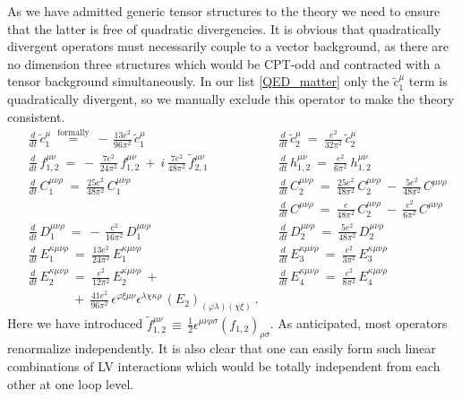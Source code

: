 \documentclass[12pt,preprintnumbers,nofootinbib]{revtex4}
\newcommand{\wt}{\widetilde}
\begin{document}
	As we have admitted generic tensor structures to the theory
	we need to ensure that the latter is free of quadratic divergencies.
	It is obvious that quadratically divergent operators must necessarily
	couple to a vector background, as there are no dimension
	three structures which would be CPT-odd and contracted with a tensor
	background simultaneously. 
	In our list \eqref{QED_matter} only the $ \wt{c}_1^\mu $ term is
	quadratically divergent, so we manually exclude this operator
	to make the theory consistent.
\begin{align*}
	&
	\frac{d} {d t}\, \wt{c}_1^\mu ~\overset{\text{formally}}{=}~
		-\, \frac{13e^2}{96\pi^2}\, \wt{c}_1^\mu
	&&
	\frac{d} {d t}\, \wt{c}_2^\mu ~=~
		\frac{e^2}{32\pi^2}\, \wt{c}_2^\mu
	\\
	&
	\frac{d} {d t}\, f_{1,2}^{\mu\nu} ~=~
		-\, \frac{7e^2}{24\pi^2}\, f_{1,2}^{\mu\nu}
		~+~
		i\, \frac{7e^2}{48\pi^2}\, \wt{f}{}_{2,1}^{\mu\nu}
	&&
	\frac{d} {d t}\, h_{1,2}^{\mu\nu} ~=~
		\frac{e^2}{6\pi^2}\ h_{1,2}^{\mu\nu} 
	\\
	&
	\frac{d} {d t}\, C_1^{\mu\nu\rho} ~=~
		\frac{25e^2}{48\pi^2}\, C_1^{\mu\nu\rho}
	&&
	\frac{d} {d t}\, C_2^{\mu\nu\rho} ~=~
		\frac{25e^2}{48\pi^2}\, C_2^{\mu\nu\rho}
		~-~
		\frac{5e^2}{48\pi^2}\, C^{\mu\nu\rho}
	\\
	&&&
	\frac{d} {d t}\, C^{\mu\nu\rho} ~=~
		\frac{e}{48\pi^2}\, C_2^{\mu\nu\rho} 
		~-~
		\frac{e^2}{6\pi^2}\, C^{\mu\nu\rho}
	\\
	&
	\frac{d} {d t}\, D_1^{\mu\nu\rho} ~=~
		-\, \frac{e^2}{16\pi^2}\, D_1^{\mu\nu\rho}
	&&
	\frac{d} {d t}\, D_2^{\mu\nu\rho} ~=~
		\frac{5e^2}{48\pi^2}\, D_2^{\mu\nu\rho}
	\\
	&
	\frac{d} {d t}\, E_1^{\kappa\mu\nu\rho} ~=~
		\frac{13e^2}{24\pi^2}\, E_1^{\kappa\mu\nu\rho}
	&&
	\frac{d} {d t}\, E_3^{\kappa\mu\nu\rho} ~=~
		\frac{e^2}{3\pi^2}\, E_3^{\kappa\mu\nu\rho}
	\\
	&
	\frac{d} {d t}\, E_2^{\kappa\mu\nu\rho} ~=~
		\frac{e^2}{12\pi^2}\, E_2^{\kappa\mu\nu\rho}
		~+~      
	&&
	\frac{d} {d t}\, E_4^{\kappa\mu\nu\rho} ~=~
		\frac{e^2}{8\pi^2}\, E_4^{\kappa\mu\nu\rho}
	\\
	&
	\phantom{\frac{d} {d t}\, E_2^{\kappa\mu\nu\rho}}
		~+~ \frac{41e^2}{96\pi^2}\,
		\epsilon^{\varphi\xi\mu\nu} 
		\epsilon^{\lambda\chi\kappa\rho}\,
		(E_2)_{(\varphi\lambda)(\chi\xi)}
	~.
\end{align*}	
	Here we have introduced $ \wt{f}{}_{1,2}^{\mu\nu} \,\equiv\, \frac{1}{2} 
		\epsilon^{\mu\nu\rho\sigma} (f_{1,2})_{\rho\sigma} $.
	As anticipated, most operators renormalize independently.
	It is also clear that one can easily form such linear combinations
	of LV interactions which would be totally independent from each other
	at one loop level.
\end{document}
